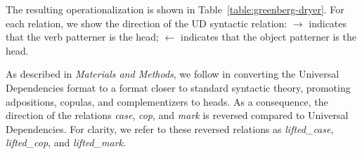 \documentclass[10pt,twoside,lineno]{article}
\begin{document}
The resulting operationalization is shown in Table~\ref{table:greenberg-dryer}.
For each relation, we show the direction of the UD syntactic relation: $\rightarrow$ indicates that the verb patterner is the head; $\leftarrow$ indicates that the object patterner is the head.

As described in \emph{Materials and Methods}, we follow \citet{futrell2015largescale} in converting the Universal Dependencies format to a format closer to standard syntactic theory, promoting adpositions, copulas, and complementizers to heads.
As a consequence, the direction of the relations \emph{case}, \emph{cop}, and \emph{mark} is reversed compared to Universal Dependencies.
For clarity, we refer to these reversed relations as \emph{lifted\_case}, \emph{lifted\_cop}, and \emph{lifted\_mark}.
\end{document}
